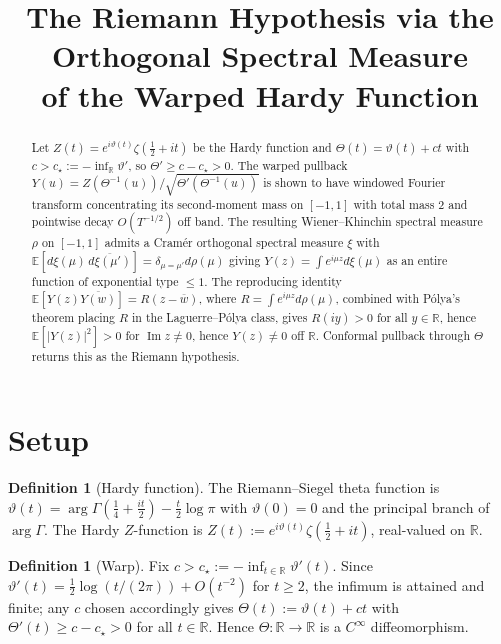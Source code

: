 \documentclass[11pt]{article}
\title{The Riemann Hypothesis via the Orthogonal Spectral Measure\\of the Warped Hardy Function}
\author{}
\date{}
\theoremstyle{definition}
\newtheorem{definition}[theorem]{Definition}
\theoremstyle{remark}
\newcommand{\R}{\mathbb{R}}
\newcommand{\E}{\mathbb{E}}
\DeclareMathOperator{\Imag}{Im}
\begin{document}
\maketitle

\begin{abstract}
Let $Z(t) = e^{i\vartheta(t)}\zeta(\tfrac12+it)$ be the Hardy function and $\Theta(t) = \vartheta(t)+ct$ with $c > c_\star := -\inf_\R \vartheta'$, so $\Theta' \geq c - c_\star > 0$. The warped pullback $Y(u) = Z(\Theta^{-1}(u))/\sqrt{\Theta'(\Theta^{-1}(u))}$ is shown to have windowed Fourier transform concentrating its second-moment mass on $[-1,1]$ with total mass $2$ and pointwise decay $O(T^{-1/2})$ off band. The resulting Wiener--Khinchin spectral measure $\rho$ on $[-1,1]$ admits a Cram\'er orthogonal spectral measure $\xi$ with $\E[d\xi(\mu)\,\overline{d\xi(\mu')}] = \delta_{\mu=\mu'} d\rho(\mu)$ giving $Y(z) = \int e^{i\mu z}d\xi(\mu)$ as an entire function of exponential type $\leq 1$. The reproducing identity $\E[Y(z)\overline{Y(w)}] = R(z-\overline w)$, where $R = \int e^{i\mu z} d\rho(\mu)$, combined with P\'olya's theorem placing $R$ in the Laguerre--P\'olya class, gives $R(iy) > 0$ for all $y \in \R$, hence $\E[|Y(z)|^2] > 0$ for $\Imag z \neq 0$, hence $Y(z) \neq 0$ off $\R$. Conformal pullback through $\Theta$ returns this as the Riemann hypothesis.
\end{abstract}

\tableofcontents

\section{Setup}

\begin{definition}[Hardy function]
The Riemann--Siegel theta function is $\vartheta(t) = \arg\Gamma(\tfrac14 + \tfrac{it}{2}) - \tfrac{t}{2}\log\pi$ with $\vartheta(0) = 0$ and the principal branch of $\arg\Gamma$. The Hardy $Z$-function is $Z(t) := e^{i\vartheta(t)}\zeta(\tfrac12+it)$, real-valued on $\R$.
\end{definition}

\begin{definition}[Warp]
Fix $c > c_\star := -\inf_{t \in \R} \vartheta'(t)$. Since $\vartheta'(t) = \tfrac12\log(t/(2\pi)) + O(t^{-2})$ for $t \geq 2$, the infimum is attained and finite; any $c$ chosen accordingly gives $\Theta(t) := \vartheta(t) + ct$ with $\Theta'(t) \geq c - c_\star > 0$ for all $t \in \R$. Hence $\Theta: \R \to \R$ is a $C^\infty$ diffeomorphism.
\end{definition}
\end{document}
